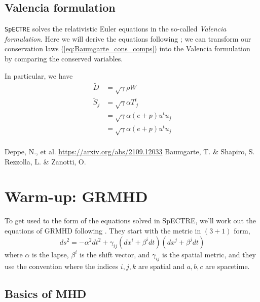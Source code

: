 \documentclass[12pt]{article}
\numberwithin{equation}{section}
\begin{document}
\subsection{Valencia formulation}

{\tt SpECTRE} solves the relativistic Euler equations in the so-called \textit{Valencia formulation}.
Here we will derive the equations following \cite{RezzollaZanotti}; we can transform our conservation laws (\ref{eq:Baumgarte_cons_comps}) into the Valencia formulation by comparing the conserved variables.

In particular, we have
\begin{equation}
\begin{aligned}
\tilde{D} &= \sqrt{\gamma} \rho W \\
\tilde{S}_j &= \sqrt{\gamma} \alpha T^{t}_{~j} \\
&= \sqrt{\gamma} \alpha (e + p) u^t u_j \\
&= \sqrt{\gamma} \alpha (e + p) u^t u_j \\
\end{aligned}
\end{equation}


\clearpage

\begin{thebibliography}{10}
 Deppe, N., et al. \url{https://arxiv.org/abs/2109.12033}
 Baumgarte, T. \& Shapiro, S.
 Rezzolla, L. \& Zanotti, O.
\end{thebibliography}

\appendix

\clearpage

\section{Warm-up: GRMHD}

To get used to the form of the equations solved in SpECTRE, we'll work out the
 equations of GRMHD following \cite{Deppe22}.
They start with the metric in $(3+1)$ form,
\begin{equation}
ds^2 = - \alpha^2 dt^2 + \gamma_{ij} (dx^i + \beta^i dt) (dx^j + \beta^j dt)
\end{equation}
where $\alpha$ is the lapse, $\beta^{i}$ is the shift vector, and $\gamma_{ij}$
 is the spatial metric, and they use the convention where the indices $i,j,k$
 are spatial and $a,b,c$ are spacetime.

\subsection{Basics of MHD}
\end{document}
